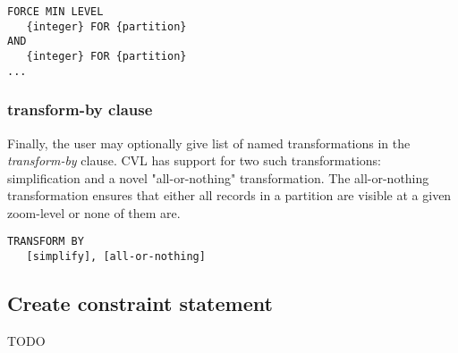 \begin{lstlisting}
FORCE MIN LEVEL
   {integer} FOR {partition}
AND
   {integer} FOR {partition}
...
\end{lstlisting}

\subsubsection{transform-by clause}

Finally, the user may optionally give list of named transformations in the \emph{transform-by} clause. CVL has support for two such transformations: simplification and a novel "all-or-nothing" transformation. The all-or-nothing transformation ensures that either all records in a partition are visible at a given zoom-level or none of them are.

\begin{lstlisting}
TRANSFORM BY
   [simplify], [all-or-nothing]
\end{lstlisting}

\subsection{Create constraint statement}

TODO

